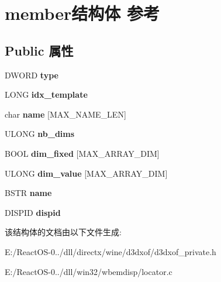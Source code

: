 \hypertarget{structmember}{}\section{member结构体 参考}
\label{structmember}
\subsection*{Public 属性}
\begin{DoxyCompactItemize}
\item 
\mbox{\label{structmember_ae30f3b33e3595abab21926d40eb47a8e}} 
D\+W\+O\+RD {\bfseries type}
\item 
\mbox{\label{structmember_a2a312e817ca926943b20a5d94279bb2a}} 
L\+O\+NG {\bfseries idx\+\_\+template}
\item 
\mbox{\label{structmember_a4b2605ffb99c12b0ce186996aa850564}} 
char {\bfseries name} \mbox{[}M\+A\+X\+\_\+\+N\+A\+M\+E\+\_\+\+L\+EN\mbox{]}
\item 
\mbox{\label{structmember_a1fe6e3d1d105516230354cc42e6c78ef}} 
U\+L\+O\+NG {\bfseries nb\+\_\+dims}
\item 
\mbox{\label{structmember_a3a068b98eef6aa54879f4ba02884f38a}} 
B\+O\+OL {\bfseries dim\+\_\+fixed} \mbox{[}M\+A\+X\+\_\+\+A\+R\+R\+A\+Y\+\_\+\+D\+IM\mbox{]}
\item 
\mbox{\label{structmember_af43b331b12a7c2e6918c94916002d37d}} 
U\+L\+O\+NG {\bfseries dim\+\_\+value} \mbox{[}M\+A\+X\+\_\+\+A\+R\+R\+A\+Y\+\_\+\+D\+IM\mbox{]}
\item 
\mbox{\label{structmember_aad6c8f7ab67d5b2f0404739adb9d9e30}} 
B\+S\+TR {\bfseries name}
\item 
\mbox{\label{structmember_a31caed77c5665519c258dcc686f87c63}} 
D\+I\+S\+P\+ID {\bfseries dispid}
\end{DoxyCompactItemize}


该结构体的文档由以下文件生成\+:\begin{DoxyCompactItemize}
\item 
E\+:/\+React\+O\+S-\/0../dll/directx/wine/d3dxof/d3dxof\+\_\+private.\+h\item 
E\+:/\+React\+O\+S-\/0../dll/win32/wbemdisp/locator.\+c\end{DoxyCompactItemize}
